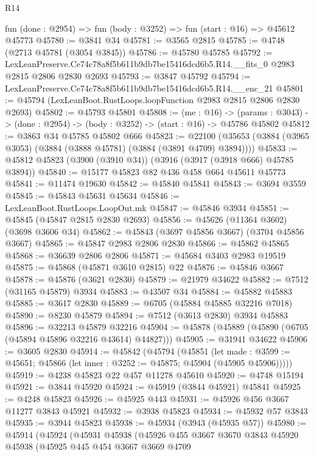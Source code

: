 \begin{lexlean}{R14}
\begin{coremodule}
  fun (done : @2954) => fun (body : @3252) => fun (start : @16) => @45612 @45773
@45780 := @3841 @34
@45781 := @3565 @2815
@45785 := @4748 (@2713 @45781 (@3054 @3845))
@45786 := @45780 @45785
@45792 := LexLeanPreserve.Ce74c78a8f5b611b9db7be15416dcd6b5.R14.__fits_0
    @2983
    @2815
    @2806
    @2830
    @2693
@45793 := @3847 @45792
@45794 := LexLeanPreserve.Ce74c78a8f5b611b9db7be15416dcd6b5.R14.__enc_21
@45801 := @45794 (LexLeanBoot.RustLoops.loopFunction @2983 @2815 @2806 @2830 @2693)
@45802 := @45793 @45801
@45808 := (me : @16) ->
  (params : @3043) -> (done : @2954) -> (body : @3252) -> (start : @16) -> @45786 @45802
@45812 := @3863 @34 @45785 @45802 @666
@45823 := @22100 (@35653 (@3884 (@3965 @3053) (@3884 (@3888 @45781) (@3884 (@3891 @4709) @3894))))
@45833 := @45812 @45823 (@3900 (@3910 @34)) (@3916 (@3917 (@3918 @666) @45785 @3894))
@45840 := @15177 @45823 @82 @436 @458 @664 @45611 @45773
@45841 := @11474 @19630
@45842 := @45840 @45841
@45843 := @3694 @3559
@45845 := @45843 @45631 @45634
@45846 := LexLeanBoot.RustLoops.LoopOut.mk
@45847 := @45846 @3934
@45851 := @45845 (@45847 @2815 @2830 @2693)
@45856 := @45626 (@11364 @3602) (@3698 @3606 @34)
@45862 := @45843 (@3697 @45856 @3667) (@3704 @45856 @3667)
@45865 := @45847 @2983 @2806 @2830
@45866 := @45862 @45865
@45868 := @36639 @2806 @2806
@45871 := @45684 @3403 @2983 @19519
@45875 := @45868 (@45871 @3610 @2815) @22
@45876 := @45846 @3667
@45878 := @45876 (@3621 @2830)
@45879 := @21979 @34622
@45882 := @7512 (@31165 @45879) @3934
@45883 := @43507 @34
@45884 := @45882 @45883
@45885 := @3617 @2830
@45889 := @6705 (@45884 @45885 @32216 @7018)
@45890 := @8230 @45879
@45894 := @7512 (@3613 @2830) @3934 @45883
@45896 := @32213 @45879 @32216
@45904 := @45878 (@45889 (@45890 (@6705 (@45894 @45896 @32216 @43614) @44827)))
@45905 := @31941 @34622
@45906 := @3605 @2830
@45914 := @45842
    (@45794
      (@45851
        (let made : @3599 := @45651; @45866 (let inner : @3252 := @45875; @45904 (@45905 @45906)))))
@45919 := @4238 @45823 @22 @457 @11278 @45610
@45920 := @4748 @15194
@45921 := @3844 @45920
@45924 := @45919 (@3844 @45921) @45841
@45925 := @4248 @45823
@45926 := @45925 @443
@45931 := @45926 @456 @3667 @11277 @3843 @45921
@45932 := @3938 @45823
@45934 := @45932 @57 @3843
@45935 := @3944 @45823
@45938 := @45934 (@3943 (@45935 @57))
@45980 := @45914
    (@45924
      (@45931
        @45938
        (@45926
          @455
          @3667
          @3670
          @3843
          @45920
          @45938
          (@45925
            @445
            @454
            @3667
            @3669
            @4709

\end{coremodule}
\end{lexlean}

